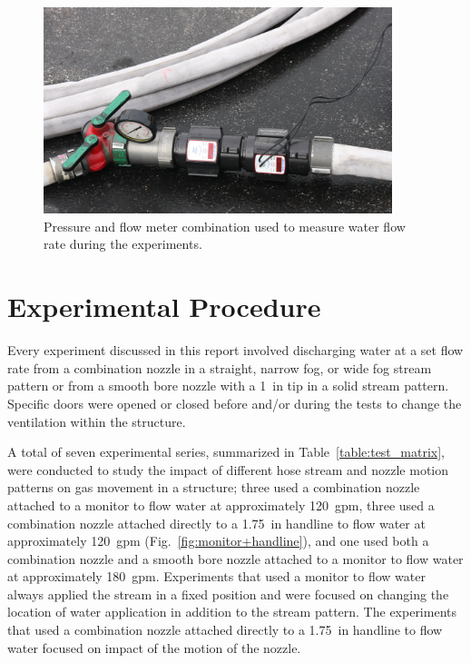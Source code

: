 \documentclass[12pt,oneside]{book}
\begin{document}
\begin{figure}[!ht]
	\includegraphics[width=4in]{../Figures/Pictures/flow_meter}
	\caption[Flow meter used to measure flow rate during experiments.]{Pressure and flow meter combination used to measure water flow rate during the experiments.}
	\label{fig:flow_meter}
\end{figure}
\FloatBarrier

\section{Experimental Procedure}
\label{sec:exp_procedure}
Every experiment discussed in this report involved discharging water at a set flow rate from a combination nozzle in a straight, narrow fog, or wide fog stream pattern or from a smooth bore nozzle with a 1~in tip in a solid stream pattern. Specific doors were opened or closed before and/or during the tests to change the ventilation within the structure. 

A total of seven experimental series, summarized in Table~\ref{table:test_matrix}, were conducted to study the impact of different hose stream and nozzle motion patterns on gas movement in a structure; three used a combination nozzle attached to a monitor to flow water at approximately 120~gpm, three used a combination nozzle attached directly to a 1.75~in handline to flow water at approximately 120~gpm (Fig.~\ref{fig:monitor+handline}), and one used both a combination nozzle and a smooth bore nozzle attached to a monitor to flow water at approximately 180~gpm. Experiments that used a monitor to flow water always applied the stream in a fixed position and were focused on changing the location of water application in addition to the stream pattern. The experiments that used a combination nozzle attached directly to a 1.75~in handline to flow water focused on impact of the motion of the nozzle.
\end{document}
